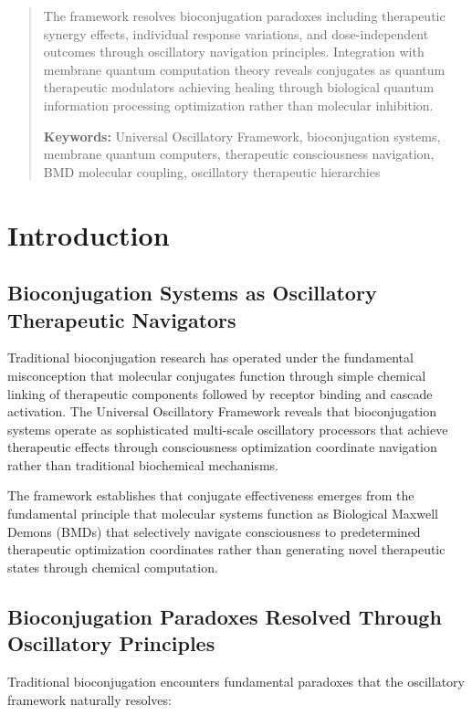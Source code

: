 \documentclass[12pt,a4paper]{article}
\begin{document}
\begin{abstract}
The framework resolves bioconjugation paradoxes including therapeutic synergy effects, individual response variations, and dose-independent outcomes through oscillatory navigation principles. Integration with membrane quantum computation theory reveals conjugates as quantum therapeutic modulators achieving healing through biological quantum information processing optimization rather than molecular inhibition.

\textbf{Keywords:} Universal Oscillatory Framework, bioconjugation systems, membrane quantum computers, therapeutic consciousness navigation, BMD molecular coupling, oscillatory therapeutic hierarchies
\end{abstract}

\section{Introduction}

\subsection{Bioconjugation Systems as Oscillatory Therapeutic Navigators}

Traditional bioconjugation research has operated under the fundamental misconception that molecular conjugates function through simple chemical linking of therapeutic components followed by receptor binding and cascade activation. The Universal Oscillatory Framework \cite{sachikonye2024mathematical,sachikonye2024physical} reveals that bioconjugation systems operate as sophisticated multi-scale oscillatory processors that achieve therapeutic effects through consciousness optimization coordinate navigation rather than traditional biochemical mechanisms.

The framework establishes that conjugate effectiveness emerges from the fundamental principle that molecular systems function as Biological Maxwell Demons (BMDs) that selectively navigate consciousness to predetermined therapeutic optimization coordinates rather than generating novel therapeutic states through chemical computation.

\subsection{Bioconjugation Paradoxes Resolved Through Oscillatory Principles}

Traditional bioconjugation encounters fundamental paradoxes that the oscillatory framework naturally resolves:
\end{document}
